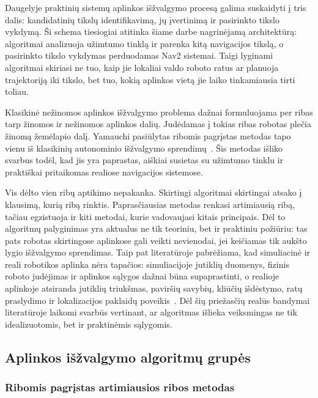 \documentclass[]{VUMIFTemplateClass}
\begin{document}
Daugelyje praktinių sistemų aplinkos išžvalgymo procesą galima suskaidyti į tris dalis: kandidatinių tikslų identifikavimą, jų įvertinimą ir pasirinkto tikslo
vykdymą. Ši schema tiesiogiai atitinka šiame darbe nagrinėjamą architektūrą: algoritmai analizuoja užimtumo tinklą ir parenka kitą navigacijos tikslą, o      
pasirinkto tikslo vykdymas perduodamas Nav2 sistemai. Taigi lyginami algoritmai skiriasi ne tuo, kaip jie lokaliai valdo roboto ratus ar planuoja trajektoriją
iki tikslo, bet tuo, kokią aplinkos vietą jie laiko tinkamiausia tirti toliau. 

Klasikinė nežinomos aplinkos išžvalgymo problema dažnai formuluojama per ribas tarp žinomos ir nežinomos aplinkos dalių. Judėdamas į tokias ribas robotas plečia žinomą žemėlapio dalį. Yamauchi pasiūlytas ribomis pagrįstas metodas tapo vienu
iš klasikinių autonominio išžvalgymo sprendimų~\cite{yamauchi1997frontier}. Šis metodas išliko svarbus todėl, kad jis yra paprastas, aiškiai susietas su
užimtumo tinklu ir praktiškai pritaikomas realiose navigacijos sistemose.

Vis dėlto vien ribų aptikimo nepakanka. Skirtingi algoritmai skirtingai atsako į klausimą, kurią ribą rinktis. Paprasčiausias metodas renkasi artimiausią ribą, tačiau egzistuoja ir kiti metodai, kurie vadovaujasi kitais principais. Dėl to algoritmų
palyginimas yra aktualus ne tik teoriniu, bet ir praktiniu požiūriu: tas pats robotas skirtingose aplinkose gali veikti nevienodai, jei keičiamas tik aukšto
lygio išžvalgymo sprendimas. Taip pat literatūroje pabrėžiama, kad simuliacinė ir reali robotikos aplinka nėra tapačios: simuliacijoje jutiklių duomenys, fizinis roboto judėjimas ir aplinkos
sąlygos dažnai būna supaprastinti, o realioje aplinkoje atsiranda jutiklių triukšmas, paviršių savybių, kliūčių išdėstymo, ratų praslydimo ir lokalizacijos
paklaidų poveikis~\cite{sim-to-real}. Dėl šių priežasčių realūs bandymai literatūroje laikomi svarbūs vertinant, ar algoritmas išlieka veiksmingas
ne tik idealizuotomis, bet ir praktinėmis sąlygomis.

\subsection{Aplinkos išžvalgymo algoritmų grupės}

\subsubsection{Ribomis pagrįstas artimiausios ribos metodas}
\end{document}
